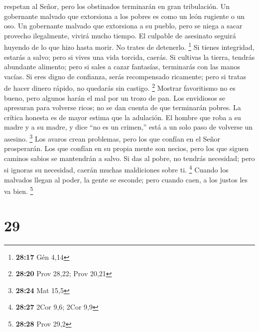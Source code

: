 respetan al Señor, pero los obstinados terminarán en gran tribulación.
 Un gobernante malvado que extorsiona a los pobres es como
un león rugiente o un oso.  Un gobernante malvado que
extorsiona a su pueblo, pero se niega a sacar provecho ilegalmente,
vivirá mucho tiempo.  El culpable de asesinato seguirá
huyendo de lo que hizo hasta morir. No trates de detenerlo. \footnote{\textbf{28:17}
  Gén 4,14}  Si tienes integridad, estarás a salvo; pero si
vives una vida torcida, caerás.  Si cultivas la tierra,
tendrás abundante alimento; pero si sales a cazar fantasías, terminarás
con las manos vacías.  Si eres digno de confianza, serás
recompensado ricamente; pero si tratas de hacer dinero rápido, no
quedarás sin castigo. \footnote{\textbf{28:20} Prov 28,22; Prov 20,21}
 Mostrar favoritismo no es bueno, pero algunos harán el mal
por un trozo de pan.  Los envidiosos se apresuran para
volverse ricos; no se dan cuenta de que terminarán pobres. 
La crítica honesta es de mayor estima que la adulación.  El
hombre que roba a su madre y a su madre, y dice ``no es un crimen,''
está a un solo paso de volverse un asesino. \footnote{\textbf{28:24} Mat
  15,5}  Los avaros crean problemas, pero los que confían
en el Señor prosperarán.  Los que confían en su propia
mente son necios, pero los que siguen caminos sabios se mantendrán a
salvo.  Si das al pobre, no tendrás necesidad; pero si
ignoras su necesidad, caerán muchas maldiciones sobre ti. \footnote{\textbf{28:27}
  2Cor 9,6; 2Cor 9,9}  Cuando los malvados llegan al poder,
la gente se esconde; pero cuando caen, a los justos les va bien.
\footnote{\textbf{28:28} Prov 29,2}

\hypertarget{section-28}{%
\section{29}\label{section-28}}

